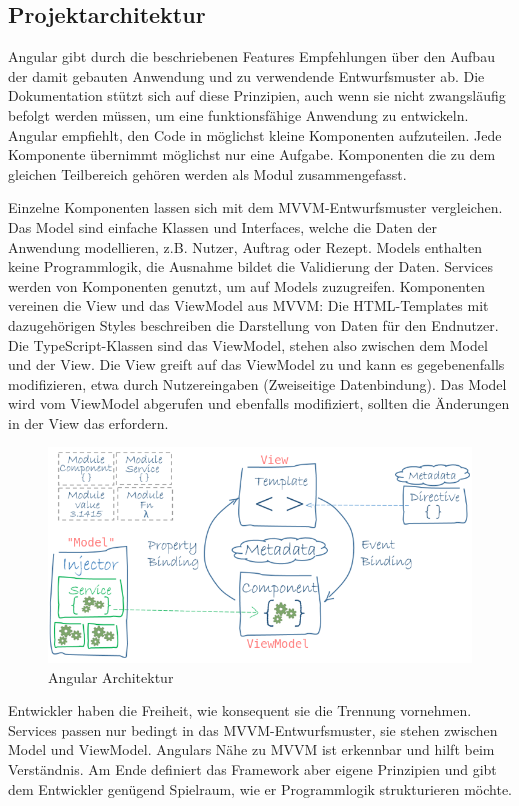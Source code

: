 \subsection{Projektarchitektur}
Angular gibt durch die beschriebenen Features Empfehlungen über den Aufbau der damit gebauten Anwendung und zu verwendende Entwurfsmuster ab. Die Dokumentation stützt sich auf diese Prinzipien, auch wenn sie nicht zwangsläufig befolgt werden müssen, um eine funktionsfähige Anwendung zu entwickeln. Angular empfiehlt, den Code in möglichst kleine Komponenten aufzuteilen. Jede Komponente übernimmt möglichst nur eine Aufgabe. Komponenten die zu dem gleichen Teilbereich gehören werden als Modul zusammengefasst.

Einzelne Komponenten lassen sich mit dem MVVM-Entwurfsmuster vergleichen. Das Model sind einfache Klassen und Interfaces, welche die Daten der Anwendung modellieren, z.B. Nutzer, Auftrag oder Rezept. Models enthalten keine Programmlogik, die Ausnahme bildet die Validierung der Daten. Services werden von Komponenten genutzt, um auf Models zuzugreifen. Komponenten vereinen die View und das ViewModel aus MVVM: Die HTML-Templates mit dazugehörigen Styles beschreiben die Darstellung von Daten für den Endnutzer. Die TypeScript-Klassen sind das ViewModel, stehen also zwischen dem Model und der View. Die View greift auf das ViewModel zu und kann es gegebenenfalls modifizieren, etwa durch Nutzereingaben (Zweiseitige Datenbindung). Das Model wird vom ViewModel abgerufen und ebenfalls modifiziert, sollten die Änderungen in der View das erfordern.

\begin{figure}
  \centering
  \includegraphics[scale=0.6]{Grafiken/MVW.png}
  \caption{Angular Architektur}
\end{figure}

Entwickler haben die Freiheit, wie konsequent sie die Trennung vornehmen. Services passen nur bedingt in das MVVM-Entwurfsmuster, sie stehen zwischen Model und ViewModel. Angulars Nähe zu MVVM ist erkennbar und hilft beim Verständnis. Am Ende definiert das Framework aber eigene Prinzipien und gibt dem Entwickler genügend Spielraum, wie er Programmlogik strukturieren möchte.\cite{MVVM}\cite{AngularArchitecture}

